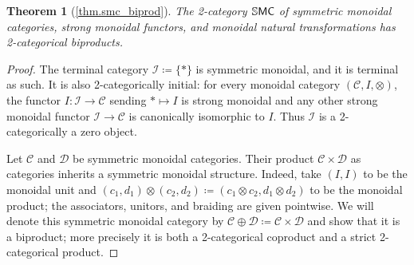\documentclass[11pt, oneside, article]{memoir}
\theoremstyle{plain}
\newtheorem*{theorem*}{Theorem}
\theoremstyle{definition}
\theoremstyle{remark}
\newcommand{\cat}[1]{\mathcal{#1}}%
\newcommand{\Cat}[1]{{\mathsf{#1}}}%
\newcommand{\CCat}[1]{\mathbb{\StrLeft{#1}{1}}\Cat{\StrGobbleLeft{#1}{1}}}%
\newcommand{\ssmc}{\CCat{SMC}}
\newcommand{\zero}{\cat{I}}
\begin{document}
\begin{theorem*}[\ref{thm.smc_biprod}]\label{page.smc_biprod}
The 2-category $\ssmc$ of symmetric monoidal categories, strong monoidal functors, and monoidal natural transformations has 2-categorical biproducts.
\end{theorem*}
\begin{proof}
The terminal category $\zero\coloneqq\{*\}$ is symmetric monoidal, and it is terminal as such. It is also 2-categorically initial: for every monoidal category $(\cat{C},I,\otimes)$, the functor $I\colon\zero\to\cat{C}$ sending $*\mapsto I$ is strong monoidal and any other strong monoidal functor $\zero\to\cat{C}$ is canonically isomorphic to $I$. Thus $\cat{I}$ is a 2-categorically a zero object.

Let $\cat{C}$ and $\cat{D}$ be symmetric monoidal categories. Their product $\cat{C}\times\cat{D}$ as categories inherits a symmetric monoidal structure. Indeed, take $(I,I)$ to be the monoidal unit and $(c_1,d_1)\otimes(c_2,d_2)\coloneqq(c_1\otimes c_2,d_1\otimes d_2)$ to be the monoidal product; the associators, unitors, and braiding are given pointwise. We will denote this symmetric monoidal category by $\cat{C}\oplus\cat{D}\coloneqq\cat{C}\times\cat{D}$ and show that it is a biproduct; more precisely it is both a 2-categorical coproduct and a strict 2-categorical product.


\end{proof}
\end{document}

